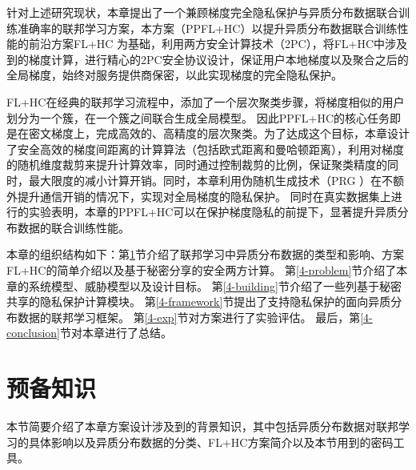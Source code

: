 


针对上述研究现状，本章提出了一个兼顾梯度完全隐私保护与异质分布数据联合训练准确率的联邦学习方案，本方案（PPFL+HC）以提升异质分布数据联合训练性能的前沿方案FL+HC \cite{briggs2020federated} 为基础，利用两方安全计算技术（2PC），将FL+HC中涉及到的梯度计算，进行精心的2PC安全协议设计，保证用户本地梯度以及聚合之后的全局梯度，始终对服务提供商保密，以此实现梯度的完全隐私保护。

FL+HC在经典的联邦学习流程中，添加了一个层次聚类步骤，将梯度相似的用户划分为一个簇，在一个簇之间联合生成全局模型。
因此PPFL+HC的核心任务即是在密文梯度上，完成高效的、高精度的层次聚类。为了达成这个目标，本章设计了安全高效的梯度间距离的计算算法（包括欧式距离和曼哈顿距离），利用对梯度的随机维度裁剪来提升计算效率，同时通过控制裁剪的比例，保证聚类精度的同时，最大限度的减小计算开销。同时，本章利用伪随机生成技术（PRG \cite{yao1982theory}）在不额外提升通信开销的情况下，实现对全局梯度的隐私保护。
同时在真实数据集上进行的实验表明，本章的PPFL+HC可以在保护梯度隐私的前提下，显著提升异质分布数据的联合训练性能。

本章的组织结构如下：第\ref{4-pre}节介绍了联邦学习中异质分布数据的类型和影响、方案FL+HC的简单介绍以及基于秘密分享的安全两方计算。
第\ref{4-problem}节介绍了本章的系统模型、威胁模型以及设计目标。
第\ref{4-building}节介绍了一些列基于秘密共享的隐私保护计算模块。
第\ref{4-framework}节提出了支持隐私保护的面向异质分布数据的联邦学习框架。
第\ref{4-exp}节对方案进行了实验评估。
最后，第\ref{4-conclusion}节对本章进行了总结。

\section{预备知识}\label{4-pre}
本节简要介绍了本章方案设计涉及到的背景知识，其中包括异质分布数据对联邦学习的具体影响以及异质分布数据的分类、FL+HC方案简介以及本节用到的密码工具。

